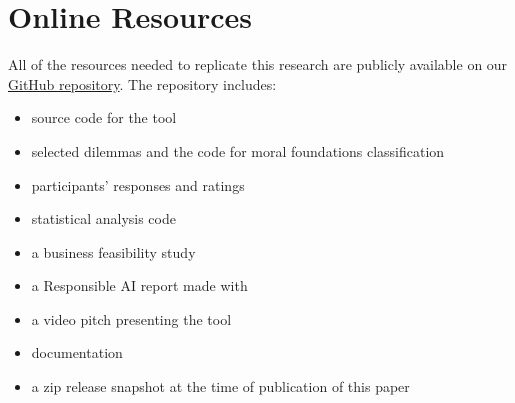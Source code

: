 \section{Online Resources}
\label{sec:resources}

All of the resources needed to replicate this research are publicly available on our
\href{https://github.com/emanuelemessina/broken-morals}{GitHub repository}.
The repository includes:
\begin{itemize}
  \item source code for the tool
  \item selected dilemmas and the code for moral foundations classification
  \item participants' responses and ratings
  \item statistical analysis code
  \item a business feasibility study
  \item a Responsible AI report made with \cite{constantinides2024raiguidelinesmethodgenerating}
  \item a video pitch presenting the tool
  \item documentation
  \item a zip release snapshot at the time of publication of this paper
\end{itemize}

